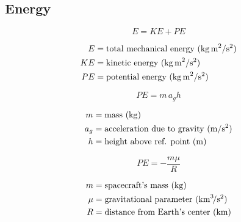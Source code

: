\documentclass{article}
\begin{document}
\subsection{Energy}
\begin{multicols}{3}
	\begin{equation*}
	\boxed{E = KE + PE}
	\end{equation*}

	\begin{align*}
	E &= \text{total mechanical energy (\si{\kilo\gram\,\meter\squared\per\second\squared)}}\\
	KE &= \text{kinetic energy (\si{\kilo\gram\,\meter\squared\per\second\squared)}}\\
	PE &= \text{potential energy (\si{\kilo\gram\,\meter\squared\per\second\squared)}}\\
	\end{align*}

	\vfill\null
	\columnbreak

	\begin{equation*}
	\boxed{PE = m\,a_{g}h}
	\end{equation*}

	\begin{align*}
	m &= \text{mass (\si{\kilo\gram})}\\
	a_{g} &= \text{acceleration due to gravity (\si{\meter\per\second\squared})}\\
	h &= \text{height above ref. point (\si{\meter})}\\
	\end{align*}
	\vfill\null
	\columnbreak

	\begin{equation*}
	\boxed{PE = -\dfrac{m\mu}{R}}
	\end{equation*}

	\begin{align*}
	m &= \text{spacecraft's mass (\si{\kilo\gram})}\\
	\mu &= \text{gravitational parameter (\si{\kilo\meter\cubed\per\second\squared})}\\
	R &= \text{distance from Earth's center (\si{\kilo\meter})}\\
	\end{align*}
	\vfill\null
\end{multicols}
\end{document}
